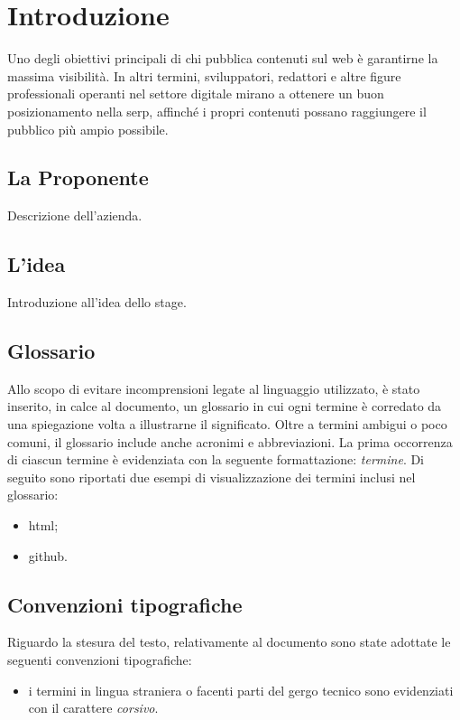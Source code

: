 \chapter{Introduzione}
\label{cap:introduzione}

\par Uno degli obiettivi principali di chi pubblica contenuti sul web è garantirne la massima visibilità. In altri termini, sviluppatori, redattori e altre figure professionali operanti nel settore digitale mirano a ottenere un buon posizionamento nella \gls{serp}, affinché i propri contenuti possano raggiungere il pubblico più ampio possibile.

\section{La Proponente}

\par Descrizione dell'azienda.

\section{L'idea}

\par Introduzione all'idea dello stage.

\section{Glossario}

\par Allo scopo di evitare incomprensioni legate al linguaggio utilizzato, è stato inserito, in calce al documento, un glossario in cui ogni termine è corredato da una spiegazione volta a illustrarne il significato. Oltre a termini ambigui o poco comuni, il glossario include anche acronimi e abbreviazioni. La prima occorrenza di ciascun termine è evidenziata con la seguente formattazione: \emph{termine}\glsfirstoccur. Di seguito sono riportati due esempi di visualizzazione dei termini inclusi nel glossario:

\begin{itemize}
    \item \gls{html};
    \item \gls{github}.
\end{itemize}

\section{Convenzioni tipografiche}

\par Riguardo la stesura del testo, relativamente al documento sono state adottate le seguenti convenzioni tipografiche:
\begin{itemize}
	\item i termini in lingua straniera o facenti parti del gergo tecnico sono evidenziati con il carattere \emph{corsivo}.
\end{itemize}
